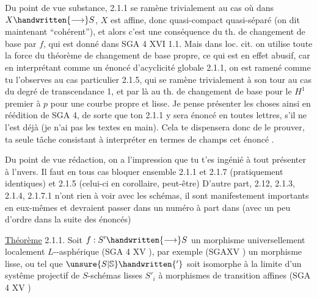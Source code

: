 Du point de vue substance, 2.1.1 se ramène trivialement au cas où dans $X\handwritten{\longrightarrow}S$, $X$ est affine, donc quasi-compact quasi-séparé (on dit maintenant ``cohérent''), et alors c'est une conséquence du th. de changement de base par $f$, qui est donné dans SGA 4 XVI 1.1. Mais dans loc. cit. on utilise toute la force du théorème de changement de base propre, ce qui est en effet abusif, car en interprétant comme un énoncé d'acyclicité globale 2.1.1, on est ramené comme tu l'observes  au cas particulier 2.1.5, qui se ramène trivialement à son tour au cas du degré de transcendance 1, et par là au th. de changement de base pour le $H^1$ premier à $p$ pour une courbe propre et lisse. Je pense présenter les choses ainsi en réédition de SGA 4, de sorte que ton 2.1.1 y sera énoncé en toutes lettres, s'il ne l'est déjà (je n'ai pas les textes en main). Cela te dispensera donc de le prouver, ta seule tâche consistant à interpréter en termes de champs cet énoncé .

Du point de vue rédaction, on a l'impression que tu t'es ingénié à tout présenter à l'nvers. Il faut en tous cas bloquer ensemble 2.1.1 et 2.1.7 (pratiquement identiques) et 2.1.5 (celui-ci en corollaire, peut-être)   D'autre part,  2.12, 2.1.3, 2.1.4, 2.1.7.1 n'ont rien à voir avec les schémas, il sont manifestement importants en eux-mêmes et devraient passer dans un numéro à part dans  (avec un peu d'ordre dans la suite des énoncés)

\uline{Théorème} 2.1.1. Soit $f:S'\handwritten{\longrightarrow}S$ un morphisme universellement localement \uline{$L$}--asphérique (SGA 4 XV ), par exemple (SGAXV ) un morphisme lisse, ou tel que $\unsure{S|\mathbb{S}}\handwritten{'}$ soit isomorphe à la limite d'un systême projectif de $S$-schémas lisses $S'_i$ à morphismes de transition affines\deleted{\unsure{,}} (SGA 4 XV )

